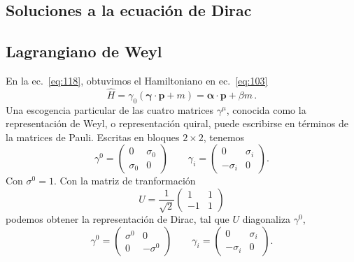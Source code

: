 \begin{subappendices}
\section{Soluciones a la ecuaci\'on de Dirac}
\label{sec:soluc-la-ecuac}

\subsection{Lagrangiano de Weyl}
\label{sec:lagrangiano-de-weyl}
\begin{borrar}
En la ec.~\eqref{eq:118}, obtuvimos el Hamiltoniano en ec.~\eqref{eq:103}
\begin{equation}
  \hat{H}= \gamma_0(\boldsymbol{\gamma}\cdot\mathbf{p}+m)=\boldsymbol{\alpha}\cdot\mathbf{p}+\beta m\,.
\end{equation}
Una escogencia particular de las cuatro matrices $\gamma^\mu$, conocida como la representaci\'on de Weyl, o representaci\'on quiral, puede escribirse en t\'erminos de la matrices de Pauli. Escritas en bloques $2\times2$, tenemos
\begin{equation}
  \gamma^0=
  \begin{pmatrix}
    0&\sigma_0\\
    \sigma_0&0
  \end{pmatrix}\qquad
  \gamma_i=\begin{pmatrix}
    0&\sigma_i\\
    -\sigma_i&0
  \end{pmatrix}.
\end{equation}
Con $\sigma^0=1$. Con la matriz de tranformaci\'on
\begin{equation}
  U=\frac{1}{\sqrt{2}}
  \begin{pmatrix}
    1&1\\
    -1&1    
  \end{pmatrix}
\end{equation}
podemos obtener la representaci\'on de Dirac, tal que $U$ diagonaliza $\gamma^0$,
\begin{equation}
  \gamma^0=
  \begin{pmatrix}
    \sigma^0&0\\
    0&-\sigma^0
  \end{pmatrix}\qquad
  \gamma_i=\begin{pmatrix}
    0&\sigma_i\\
    -\sigma_i&0
  \end{pmatrix}.
\end{equation}

\end{borrar}
\end{subappendices}
